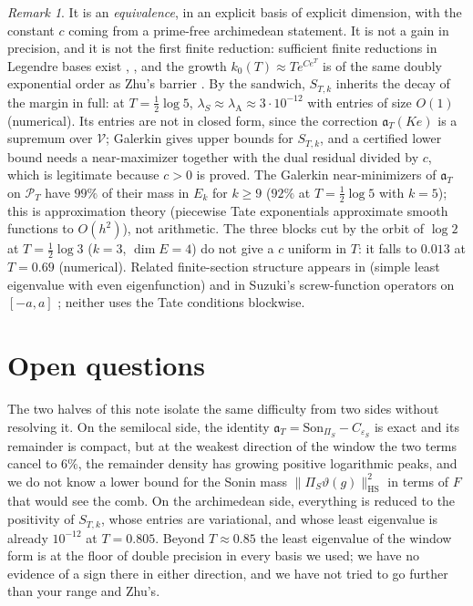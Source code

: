 \documentclass[11pt]{amsart}
\theoremstyle{definition}
\theoremstyle{remark}
\newtheorem{remark}[theorem]{Remark}
\newcommand{\PT}{\mathcal P_T}
\newcommand{\lamA}{\lambda_{\mathrm A}}
\newcommand{\Son}{\mathrm{Son}}
\begin{document}
\begin{remark}
It is an \emph{equivalence}, in an explicit basis of explicit dimension, with the constant $c$ coming from a prime-free
archimedean statement. It is not a gain in precision, and it is not the first finite reduction: sufficient finite reductions in
Legendre bases exist \cite[Thm.~1.1]{Zhu2026}, \cite{Groskin2026}, and the growth $k_0(T)\approx Te^{Ce^T}$ is of the same
doubly exponential order as Zhu's barrier \cite[Thm.~1.4]{Zhu2026}. By the sandwich, $S_{T,k}$ inherits the decay of the margin
in full: at $T=\frac12\log5$, $\lambda_S\approx\lamA\approx3\cdot10^{-12}$ with entries of size $O(1)$ (numerical). Its entries
are not in closed form, since the correction $\mathfrak a_T(Ke)$ is a supremum over $\mathcal V$; Galerkin gives upper bounds for
$S_{T,k}$, and a certified lower bound needs a near-maximizer together with the dual residual divided by $c$, which is
legitimate because $c>0$ is proved. The Galerkin near-minimizers of $\mathfrak a_T$ on $\PT$ have $99\%$ of their mass in $E_k$ for $k\ge9$ ($92\%$ at $T=\frac12\log5$ with $k=5$); this is approximation theory (piecewise Tate exponentials approximate smooth functions to $O(h^2)$), not
arithmetic. The three blocks cut by the orbit of $\log2$ at $T=\frac12\log3$ ($k=3$, $\dim E=4$) do not give a $c$ uniform in $T$: it falls to $0.013$ at
$T=0.69$ (numerical). Related finite-section structure appears in \cite{CvS2025} (simple least eigenvalue with even
eigenfunction) and in Suzuki's screw-function operators on $[-a,a]$ \cite{Suzuki2023,Suzuki2026}; neither uses the Tate
conditions blockwise.
\end{remark}

\section{Open questions}\label{sec:open}

The two halves of this note isolate the same difficulty from two sides without resolving it.
On the semilocal side, the identity $\mathfrak a_T=\Son_{\Pi_S}-C_{\varepsilon_S}$ is exact and its remainder is compact, but at the
weakest direction of the window the two terms cancel to $6\%$, the remainder density has growing positive logarithmic peaks,
and we do not know a lower bound for the Sonin mass $\|\Pi_S\vartheta(g)\|^2_{\mathrm{HS}}$ in terms of $F$ that would see the
comb. On the archimedean side, everything is reduced to the positivity of $S_{T,k}$, whose entries are variational, and whose
least eigenvalue is already $10^{-12}$ at $T=0.805$. Beyond $T\approx0.85$ the least eigenvalue of the window form is at the
floor of double precision in every basis we used; we have no evidence of a sign there in either direction, and we have not tried
to go further than your range and Zhu's.
\end{document}
